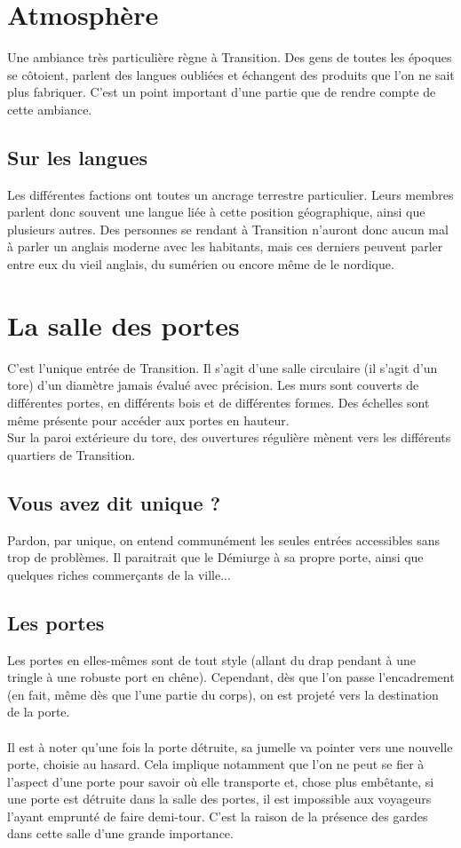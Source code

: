 \documentclass{book}
\begin{document}
\section{Atmosphère}
Une ambiance très particulière règne à Transition. Des gens de toutes les époques se côtoient, parlent des langues oubliées et échangent des produits que l'on ne sait plus fabriquer. C'est un point important d'une partie que de rendre compte de cette ambiance.

\subsection{Sur les langues}
Les différentes factions ont toutes un ancrage terrestre particulier. Leurs membres parlent donc souvent une langue liée à cette position géographique, ainsi que plusieurs autres. Des personnes se rendant à Transition n'auront donc aucun mal à parler un anglais moderne avec les habitants, mais ces derniers peuvent parler entre eux du vieil anglais, du sumérien ou encore même de le nordique. 

\section{La salle des portes}

C'est l'unique entrée de Transition. Il s'agit d'une salle circulaire (il s'agit d'un tore) d'un diamètre jamais évalué avec précision. Les murs sont couverts de différentes portes, en différents bois et de différentes formes. Des échelles sont même présente pour accéder aux portes en hauteur.\\
Sur la paroi extérieure du tore, des ouvertures régulière mènent vers les différents quartiers de Transition.

\subsection{Vous avez dit unique ?}
Pardon, par unique, on entend communément les seules entrées accessibles sans trop de problèmes. Il paraitrait que le Démiurge à sa propre porte, ainsi que quelques riches commerçants de la ville...

\subsection{Les portes}
Les portes en elles-mêmes sont de tout style (allant du drap pendant à une tringle à une robuste port en chêne). Cependant, dès que l'on passe l'encadrement (en fait, même dès que l'une partie du corps), on est projeté vers la destination de la porte.
\\
\\
Il est à noter qu'une fois la porte détruite, sa jumelle va pointer vers une nouvelle porte, choisie au hasard. Cela implique notamment que l'on ne peut se fier à l'aspect d'une porte pour savoir où elle transporte et, chose plus embêtante, si une porte est détruite dans la salle des portes, il est impossible aux voyageurs l'ayant emprunté de faire demi-tour. C'est la raison de la présence des gardes dans cette salle d'une grande importance.
\end{document}
